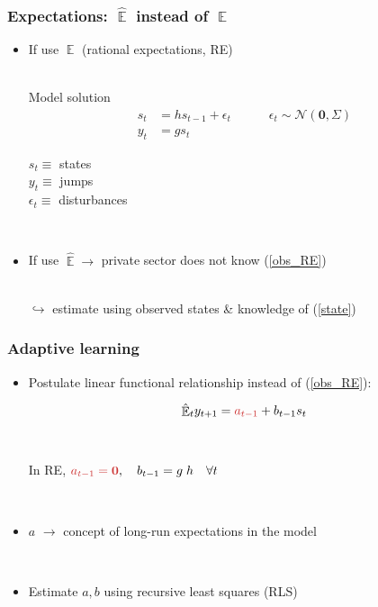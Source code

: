 \documentclass[10pt]{beamer}
\DeclareMathOperator{\E}{\mathbb{E}}
\begin{document}
\begin{frame}
	\frametitle{Expectations: $\hat{\E}$ instead of $\E$}

\begin{itemize}
\item If use $\E$ (rational expectations, RE) \\

\

Model solution 
 \begin{align}
 s_t & = h s_{t-1} + \epsilon_t \quad \quad \quad \epsilon_t \sim \mathcal{N}(\mathbf{0},\Sigma) \label{state} \\
 y_t & = g s_t \label{obs_RE}
 \end{align}


$s_t \equiv $ states \\
$y_t \equiv $ jumps \\
$\epsilon_t \equiv $ disturbances
\

\pause

\

\item If use $\hat{\E} \rightarrow$ private sector does not know (\ref{obs_RE}) \\

\

$\hookrightarrow$ estimate using observed states \& knowledge of (\ref{state})

\end{itemize}



\end{frame}

\begin{frame}
	\frametitle{Adaptive learning}
	\label{adaptive_learning}

\begin{itemize}
\item Postulate linear functional relationship instead of (\ref{obs_RE}):

\begin{equation}
\hat{\E}_t y_{t+1} = \textcolor{brownreddark}{a_{t-1}} + b_{t-1}s_t  \label{PLM_fcst_general}
\end{equation}

\

\pause

In RE, $\textcolor{brownreddark}{a_{t-1} = \mathbf{0}}, \quad b_{t-1} = g\;h \quad \forall t$

\

\pause
  


\item[] \textcolor{brownreddark}{$a$}	$\rightarrow$ concept of long-run expectations in the model

\

\pause


\item Estimate $a, b$ using recursive least squares (RLS)


\end{itemize}


\end{frame}
\end{document}
